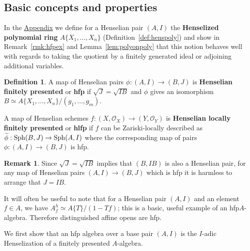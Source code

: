 \documentclass[12pt]{article}
\renewcommand{\O}{\mathscr{O}}
\newcommand{\sph}{{\rm Sph}}
\newcommand{\hlfp}{hlfp\xspace}
\newcommand{\hfp}{hfp\xspace}
\theoremstyle{definition}
\newtheorem{definition}[theorem]{Definition}
\newtheorem{remark}[theorem]{Remark}
\newenvironment{example}
  {\pushQED{\qed}\renewcommand{\qedsymbol}{$\blacksquare$}\examplex}
  {\popQED\endexamplex}
\numberwithin{equation}{subsection}
\begin{document}
\subsection{Basic concepts and properties}\label{sub:basichfp}

In the \hyperref[sec:appendix]{Appendix} we define for a Henselian pair $(A,I)$ the {\bf Henselized polynomial ring} $A\{X_1,\dots,X_n\}$ (Definition~\ref{def:henspoly}) and show in Remark~\ref{rmk:hfpex} and Lemma~\ref{lem:polyonpoly} that this notion behaves well with regards to taking the quotient by a finitely generated ideal or adjoining additional variables.

\begin{definition}\label{def:h(l)fp}
A map of Henselian pairs $\phi: (A,I) \to (B,J)$ is {\bf Henselian finitely presented} or {\bf \hfp} if $\sqrt{J}=\sqrt{IB}$ and $\phi$ gives an isomorphism $B \simeq A\{X_1,\dots,X_n\}/(g_1,\dots,g_m)$.

A map of Henselian schemes $f: (X,\O_X) \to (Y,\O_Y)$ is {\bf Henselian locally finitely presented} or {\bf \hlfp} if $f$ can be Zariski-locally described as $\widetilde{\phi}: \sph(B,J) \to \sph(A,I)$ where the corresponding map of pairs $\phi: (A,I) \to (B,J)$ is \hfp.
\end{definition}

\begin{remark}\label{rmk:rad}
Since $\sqrt{J} = \sqrt{IB}$ implies that $(B,IB)$ is also a Henselian pair, for any map of Henselian pairs $(A,I) \to (B,J)$ which is \hfp it is harmless to arrange that $J=IB$. 
\end{remark}

\begin{example}\label{ex:disthfp}
It will often be useful to note that for a Henselian pair $(A,I)$ and an element $f \in A$, we have $A_f^h \simeq A\{T\}/(1-Tf)$; this is a basic, useful example of an \hfp $A$-algebra. Therefore distinguished affine opens are \hfp. \end{example}



We first show that an \hfp algebra over a base pair $(A,I)$ is  the $I$-adic Henselization of a finitely presented $A$-algebra.
\end{document}
